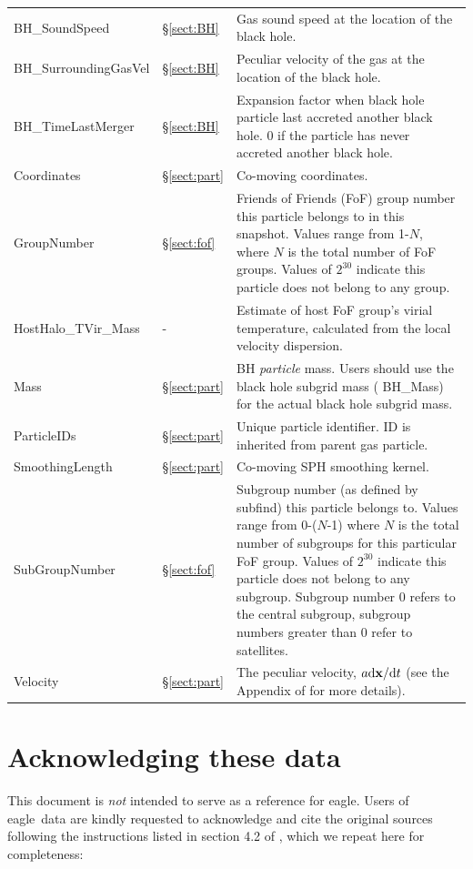 \documentclass[10pt, a4paper]{article}
\newcommand{\groupnumber}{Friends of Friends (FoF) group number this particle
belongs to in this snapshot. Values range from 1-$N$, where $N$ is the total
number of FoF groups. Values of $2^{30}$ indicate this particle does not belong
to any group.}
\newcommand{\subgroupnumber}{Subgroup number (as defined by {\sc subfind}) this
particle belongs to. Values range from 0-($N$-1) where $N$ is the total number
of subgroups for this particular FoF group. Values of $2^{30}$ indicate this
particle does not belong to any subgroup. Subgroup number 0 refers to the
central subgroup, subgroup numbers greater than 0 refer to satellites.}
\newcommand{\velocity}{The peculiar velocity, $a{\rm d}{\bf x}/{\rm d}t$ (see
the Appendix of \cite{mcalpine2016} for more details).}
\newcommand{\coordinates}{Co-moving coordinates.}
\newcommand{\eagle}{{\sc eagle}}
\begin{document}
\begin{table}
\begin{center}
\begin{tabular}{>{\ttfamily}p{4cm}p{1.5cm}p{11cm}}
BH\_SoundSpeed &
\S\ref{sect:BH} &
Gas sound speed at the location of the black hole. \\

BH\_SurroundingGasVel &
\S\ref{sect:BH} &
Peculiar velocity of the gas at the location of the black hole. \\

BH\_TimeLastMerger  &
\S\ref{sect:BH} &
Expansion factor when black hole particle last accreted another black hole. 0 if the particle has never accreted another black hole. \\

Coordinates &
\S\ref{sect:part} &
\coordinates \\

GroupNumber &
\S\ref{sect:fof} &
\groupnumber \\

HostHalo\_TVir\_Mass &
- &
Estimate of host FoF group's virial temperature, calculated from the local velocity dispersion. \\

Mass &
\S\ref{sect:part} &
BH \textit{particle} mass. Users should use the black hole subgrid mass ({\sc
BH\_Mass}) for the actual black hole subgrid mass.\\

ParticleIDs &
\S\ref{sect:part} &
Unique particle identifier. ID is inherited from parent gas particle. \\

SmoothingLength &
\S\ref{sect:part} &
Co-moving SPH smoothing kernel. \\

SubGroupNumber &
\S\ref{sect:fof}
&
\subgroupnumber \\

Velocity &
\S\ref{sect:part} & \velocity \\

\hline
\end{tabular}
\end{center}
\end{table}

\section{Acknowledging these data}
This document is \emph{not} intended to serve as a reference for \eagle.  Users
of \eagle\ data are kindly requested to acknowledge and cite the original
sources following the instructions listed in section 4.2 of
\cite{mcalpine2016}, which we repeat here for completeness:
\end{document}
